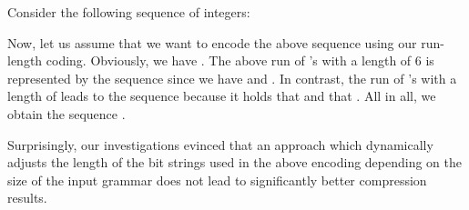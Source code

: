 \documentclass[12pt]{llncs}
\makeatletter
\renewenvironment{table}
               {\setlength\abovecaptionskip{10\p@}\setlength\belowcaptionskip{10\p@}\@float{table}}
               {\end@float}
\makeatother
\begin{document}
\begin{table}
	\footnotesize
	\hfill
	\hfill
	\hfill
\end{table}
\begin{example}
	Consider the following sequence of integers:
	\begin{center}
		
	\end{center}
	Now, let us assume that we want to encode the above sequence using our run-length coding. Obviously, we have . The above run of 's with a length of 6 is represented by the sequence  since we have  and . In contrast, the run of 's with a length of  leads to the sequence  because it holds that  and that . All in all, we obtain the sequence .
\end{example}
Surprisingly, our investigations evinced that an approach which dynamically adjusts the length of the bit strings used in the above encoding depending on the size of the input grammar does not lead to significantly better compression results.
\end{document}
